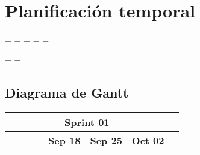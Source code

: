\chapter{Planificación temporal}
\label{cap:planificacion}

\newpage
\paperwidth=\pdfpageheight
\paperheight=\pdfpagewidth
\pdfpageheight=\paperheight
\pdfpagewidth=\paperwidth
\headwidth=\textheight

\begingroup
    \vsize=\textwidth
    \hsize=\textheight
    \section{Diagrama de Gantt}
    \label{sec:gantt}

    \begin{longtable}[c]{llclllllllllllllllll}
        \cline{1-19}
        \multicolumn{19}{|c|}{\cellcolor[HTML]{305496}\textbf{Sprint 01}}                                                                                                                                                                                                                                                                                                                                                                                                                                                                                                                                                                                                                                                                                                                                                                                                                            &  \\ \cline{1-19}
        \endfirsthead
        \endhead
        \multicolumn{1}{|c|}{\cellcolor[HTML]{FFFFFF}}                                        & \multicolumn{1}{c|}{\cellcolor[HTML]{FFFFFF}}                                  & \multicolumn{1}{c|}{\cellcolor[HTML]{FFFFFF}}                                    & \multicolumn{1}{c|}{\cellcolor[HTML]{FFFFFF}}                                        & \multicolumn{5}{c|}{\cellcolor[HTML]{FFFFFF}\textbf{Sep 18}}                                                                                                            & \multicolumn{5}{c|}{\cellcolor[HTML]{FFFFFF}\textbf{Sep 25}}                                                                                                            & \multicolumn{5}{c|}{\cellcolor[HTML]{FFFFFF}\textbf{Oct 02}}                                                                                                                          &  \\ \cline{5-19}

\end{longtable}
